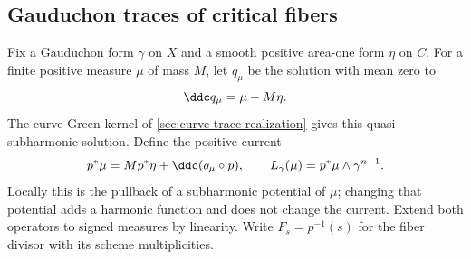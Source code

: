 \subsection{Gauduchon traces of critical fibers}

Fix a Gauduchon form $\gamma$ on $X$ and a smooth positive
area-one form $\eta$ on $C$. For a finite positive measure
$\mu$ of mass $M$, let $q_\mu$ be the solution with mean zero to
\[
 \ddc q_\mu=\mu-M\eta.
\]
The curve Green kernel of \cref{sec:curve-trace-realization}
gives this quasi-subharmonic solution. Define the positive current
\[
 p^*\mu=M p^*\eta+\ddc(q_\mu\circ p),\qquad
 L_\gamma(\mu)=p^*\mu\wedge\gamma^{n-1}.
\]
Locally this is the pullback of a subharmonic potential of $\mu$;
changing that potential adds a harmonic function and does not
change the current. Extend both operators to signed measures by
linearity. Write $F_s=p^{-1}(s)$ for the fiber divisor with its
scheme multiplicities.

